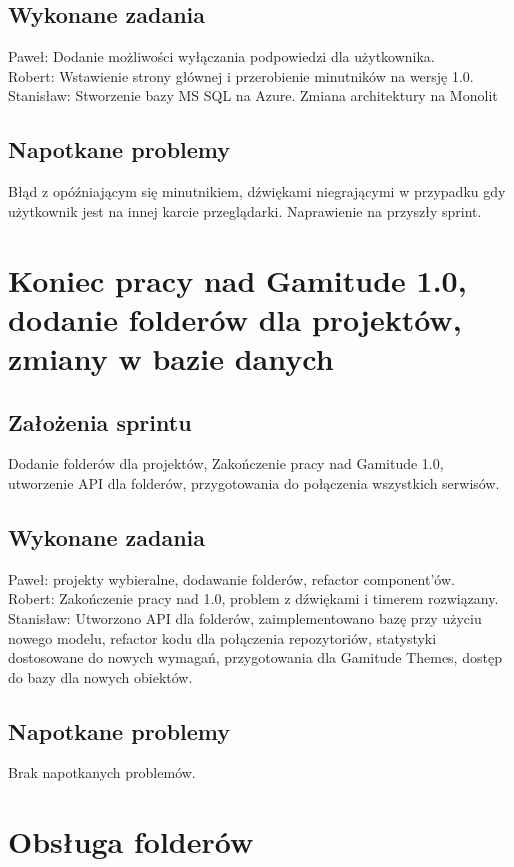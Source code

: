 \documentclass[a4paper,11pt]{report}
\begin{document}
\subsection {Wykonane zadania}
Paweł: Dodanie możliwości wyłączania podpowiedzi dla użytkownika.\\ 
Robert: Wstawienie strony głównej i przerobienie minutników na wersję 1.0. \\
Stanisław: Stworzenie bazy MS SQL na Azure. Zmiana architektury na Monolit \\
\subsection {Napotkane problemy}
Błąd z opóźniającym się minutnikiem, dźwiękami niegrającymi w przypadku gdy użytkownik jest na innej karcie przeglądarki. Naprawienie na przyszły sprint.

\section {Koniec pracy nad Gamitude 1.0, dodanie folderów dla projektów, zmiany w bazie danych}
\subsection {Założenia sprintu}
Dodanie folderów dla projektów, Zakończenie pracy nad Gamitude 1.0, utworzenie API dla folderów, przygotowania do połączenia wszystkich serwisów.
\subsection {Wykonane zadania}
Paweł: projekty wybieralne, dodawanie folderów, refactor component'ów.\\ 
Robert: Zakończenie pracy nad 1.0, problem z dźwiękami i timerem rozwiązany.\\
Stanisław: Utworzono API dla folderów, zaimplementowano bazę przy użyciu nowego modelu, refactor kodu dla połączenia repozytoriów, statystyki dostosowane do nowych wymagań, przygotowania dla Gamitude Themes, dostęp do bazy dla nowych obiektów. \\
\subsection {Napotkane problemy}
Brak napotkanych problemów.

\section {Obsługa folderów}
\end{document}
